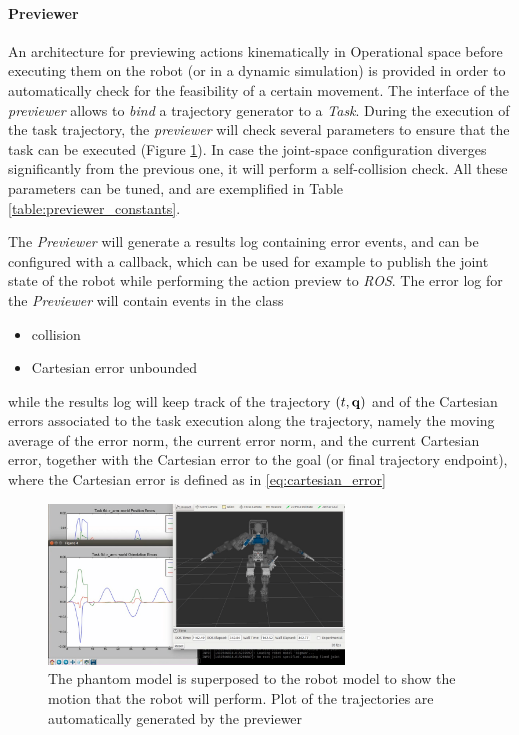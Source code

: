 \paragraph{Previewer}
\label{subsec:Previewer}
An architecture for previewing actions kinematically in Operational space before executing them on the robot (or in a dynamic simulation) is provided in order to automatically check for the feasibility of a certain movement. The interface of the \emph{previewer} allows to \emph{bind} a trajectory generator to a \emph{Task}. During the execution of the task trajectory, the \emph{previewer} will check several parameters to ensure that the task can be executed (Figure \ref{fig:previewer}). In case the joint-space configuration diverges significantly from the previous one, it will perform a self-collision check. All these parameters can be tuned, and are exemplified in Table \ref{table:previewer_constants}.

The \emph{Previewer} will generate a results log containing error events, and can be configured with a callback, which can be used for example to publish the joint state of the robot while performing the action preview to \emph{ROS}.
The error log for the \emph{Previewer} will contain events in the class
\begin{itemize}
\item collision
\item Cartesian error unbounded
\end{itemize}
while the results log will keep track of the trajectory $(t,\mathbf{q})$ and of the Cartesian errors associated to the task execution along the trajectory, namely the moving average of the error norm, the current error norm, and the current Cartesian error, together with the Cartesian error to the goal (or final trajectory endpoint), where the Cartesian error is defined as in \ref{eq:cartesian_error}
\begin{figure}
\vspace{2 mm}
\centering \includegraphics[width=0.7\textwidth]{images/software/previewer} 
\caption{The phantom model is superposed to the robot model to show the motion that the robot will perform. Plot of the trajectories are automatically generated by the previewer} 
\label{fig:previewer}
\end{figure}

